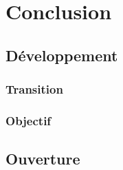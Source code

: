 %
%
%

\chapter{Conclusion}
\label{pt5-ch1-con} %



\section{Développement}
\label{pt5-ch1-1}

\subsection{Transition}
\label{pt5-ch1-sec:1.1}

\subsection{Objectif}
\label{pt5-ch1-sec:1.2}

\section{Ouverture}
\label{pt5-ch1-sec:2}

